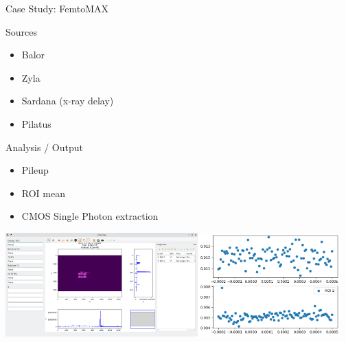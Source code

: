 \documentclass[aspectratio=169]{beamer}
\begin{document}
\begin{frame}{Case Study: FemtoMAX}
\begin{minipage}{0.5\textwidth}
\begin{block}{Sources}
   \begin{itemize}
    \item Balor
    \item Zyla
    \item Sardana (x-ray delay)
    \item Pilatus
   \end{itemize}
  \end{block}
\end{minipage}
\begin{minipage}{0.49\textwidth}
  \begin{block}{Analysis / Output}
   \begin{itemize}
    \item Pileup
    \item ROI mean
    \item CMOS Single Photon extraction
   \end{itemize}
  \end{block}
  \end{minipage}
  \vfill
\centering
\includegraphics[height=4cm]{img/femtomax}\includegraphics[height=4cm]{img/means}

\end{frame}
\end{document}
